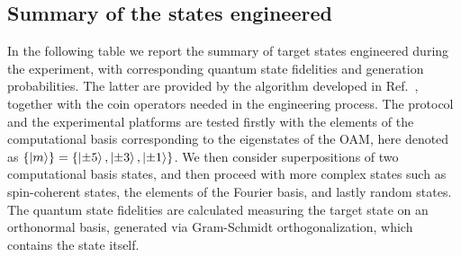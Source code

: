 \subsection{Summary of the states engineered}
In the following table we report the summary of target states engineered during the experiment, with corresponding quantum state fidelities and generation probabilities. The latter are provided by the algorithm developed in Ref.~\cite{Innocenti2017}, together with the coin operators needed in the engineering process.
The protocol and the experimental platforms are tested firstly with the elements of the computational basis corresponding to the eigenstates of the OAM, here denoted as $\{\ket{m} \}=\{\ket{\pm5}, \ket{\pm3},\ket{\pm1} \}$. We then consider superpositions of two computational basis states, and then proceed with more complex states such as spin-coherent states, the elements of the Fourier basis, and lastly random states. The quantum state fidelities are calculated measuring the target state on an orthonormal basis, generated via Gram-Schmidt orthogonalization, which contains the state itself.


